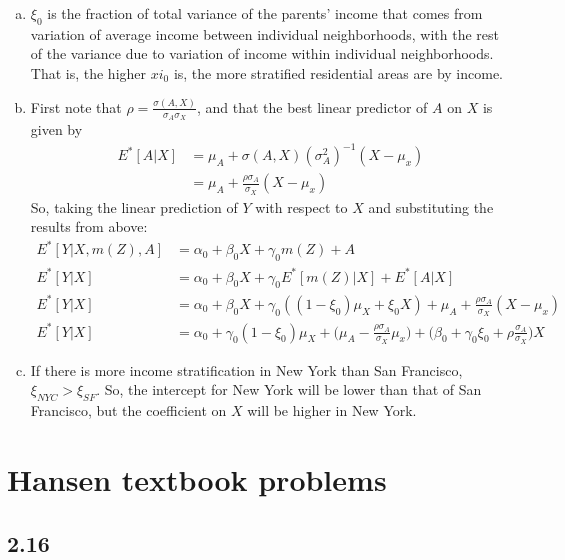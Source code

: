 \documentclass{article}[14pt]
\begin{document}
\begin{enumerate}
\begin{enumerate}[(a)]
        \item $\xi_0$ is the fraction of total variance of the parents' income that comes from variation of average income between individual neighborhoods, with the rest of the variance due to variation of income within individual neighborhoods. That is, the higher $xi_0$ is, the more stratified residential areas are by income.

        \item First note that $\rho = \frac{\sigma(A,X)}{\sigma_A \sigma_X}$, and that the best linear predictor of $A$ on $X$ is given by
        \begin{align*}
            E^*[A|X] &= \mu_A + \sigma(A,X)(\sigma_A^2)^{-1} (X-\mu_x) \\
            &= \mu_A + \frac{\rho \sigma_A}{\sigma_X} (X-\mu_x)
        \end{align*}
        So, taking the linear prediction of $Y$ with respect to $X$ and substituting the results from above:
        \begin{align*}
            E^*[Y|X,m(Z),A] &= \alpha_0 + \beta_0 X + \gamma_0 m(Z) + A \\
            E^*[Y|X] &= \alpha_0 + \beta_0 X + \gamma_0 E^*[m(Z)|X] + E^*[A|X] \\
            E^*[Y|X] &= \alpha_0 + \beta_0 X + \gamma_0((1-\xi_0)\mu_X + \xi_0 X) + \mu_A + \frac{\rho \sigma_A}{\sigma_X} (X-\mu_x) \\
            E^*[Y|X] &= \alpha_0 + \gamma_0(1-\xi_0)\mu_X + \Big( \mu_A - \frac{\rho \sigma_A}{\sigma_X}\mu_x\Big) + \Big( \beta_0 + \gamma_0 \xi_0 + \rho \frac{\sigma_A}{\sigma_X}\Big) X
        \end{align*}

        \item If there is more income stratification in New York than San Francisco, $\xi_{NYC} > \xi_{SF}$. So, the intercept for New York will be lower than that of San Francisco, but the coefficient on $X$ will be higher in New York.

    \end{enumerate}

\end{enumerate}

\section{Hansen textbook problems}

    \subsection*{2.16}
\end{document}
